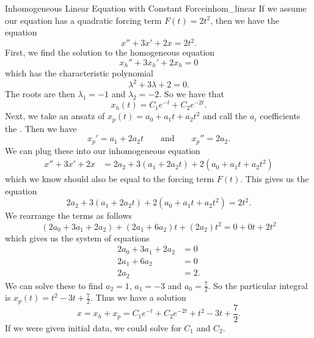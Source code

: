         \begin{ex}{Inhomogeneous Linear Equation with Constant Force}{inhom_linear}
        If we assume our equation has a quadratic forcing term $F(t)=2t^2$, then we have the equation
        \[
        x''+3x'+2x=2t^2.
        \]
        First, we find the solution to the homogeneous equation
        \[
        x_h''+3x_h'+2x_h=0
        \]
        which has the characteristic polynomial
        \[
        \lambda^2+3\lambda+2=0.
        \]
        The roots are then $\lambda_1=-1$ and $\lambda_2=-2.$ So we have that
        \[
        x_h(t)=C_1e^{-t}+C_2e^{-2t}.
        \]
        Next, we take an ansatz of $x_p(t)=a_0+a_1t+a_2t^2$ and call the $a_i$ coefficients the .  Then we have
        \[
        x_p'=a_1+2a_2t \qquad \textrm{and} \qquad x_p''=2a_2.
        \]
        We can plug these into our inhomogeneous equation
        \begin{align*}
        x''+3x'+2x&= 2a_2+3(a_1+2a_2t)+2(a_0+a_1t+a_2t^2)
        \end{align*}
        which we know should also be equal to the forcing term $F(t)$.  This gives us the equation
        \[
        2a_2+3(a_1+2a_2t)+2(a_0+a_1t+a_2t^2)=2t^2.
        \]
        We rearrange the terms as follows
        \[
        (2a_0+3a_1+2a_2)+(2a_1+6a_2)t+(2a_2)t^2=0+0t+2t^2
        \]
        which gives us the system of equations
        \begin{align*}
            2a_0+3a_1+2a_2&=0\\
            2a_1+6a_2&=0\\
            2a_2&=2.
        \end{align*}
        We can solve these to find $a_2=1$, $a_1=-3$ and $a_0=\frac{7}{2}$. So the particular integral is $x_p(t)=t^2-3t+\frac{7}{2}$.  Thus we have a solution
        \[
        x=x_h+x_p=C_1e^{-t}+C_2e^{-2t}+t^2-3t+\frac{7}{2}.
        \]
        If we were given initial data, we could solve for $C_1$ and $C_2$.
        \end{ex}
        
